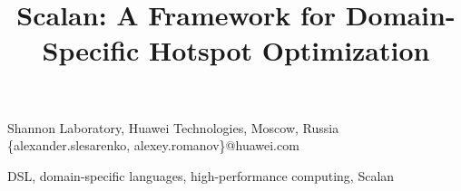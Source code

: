 \documentclass[preprint]{sigplanconf}
\begin{document}
\setlength{\pdfpageheight}{\paperheight}
\setlength{\pdfpagewidth}{\paperwidth}






\title{Scalan: A Framework for Domain-Specific Hotspot Optimization} %

           {Shannon Laboratory, Huawei Technologies, Moscow, Russia}
           {\{alexander.slesarenko, alexey.romanov\}@huawei.com}

\maketitle



\keywords
DSL, domain-specific languages, high-performance computing, Scalan
\end{document}
